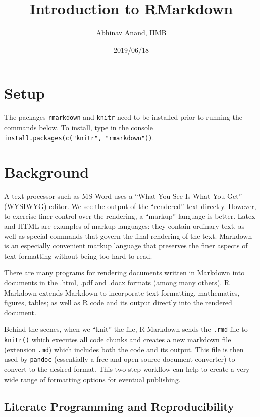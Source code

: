 \documentclass[11pt,]{article}
\title{Introduction to RMarkdown}
\author{Abhinav Anand, IIMB}
\date{2019/06/18}
\begin{document}
\maketitle

\section{Setup}\label{setup}

The packages \texttt{rmarkdown} and \texttt{knitr} need to be installed
prior to running the commands below. To install, type in the console
\texttt{install.packages(c("knitr",\ "rmarkdown"))}.

\section{Background}\label{background}

A text processor such as MS Word uses a ``What-You-See-Is-What-You-Get''
(WYSIWYG) editor. We see the output of the ``rendered'' text directly.
However, to exercise finer control over the rendering, a ``markup''
language is better. Latex and HTML are examples of markup languages:
they contain ordinary text, as well as special commands that govern the
final rendering of the text. Markdown is an especially convenient markup
language that preserves the finer aspects of text formatting without
being too hard to read.

There are many programs for rendering documents written in Markdown into
documents in the .html, .pdf and .docx formats (among many others). R
Markdown extends Markdown to incorporate text formatting, mathematics,
figures, tables; as well as R code and its output directly into the
rendered document.

Behind the scenes, when we ``knit'' the file, R Markdown sends the
\texttt{.rmd} file to \texttt{knitr()} which executes all code chunks
and creates a new markdown file (extension \texttt{.md}) which includes
both the code and its output. This file is then used by \texttt{pandoc}
(essentially a free and open source document converter) to convert to
the desired format. This two-step workflow can help to create a very
wide range of formatting options for eventual publishing.

\subsection{Literate Programming and
Reproducibility}\label{literate-programming-and-reproducibility}
\end{document}
